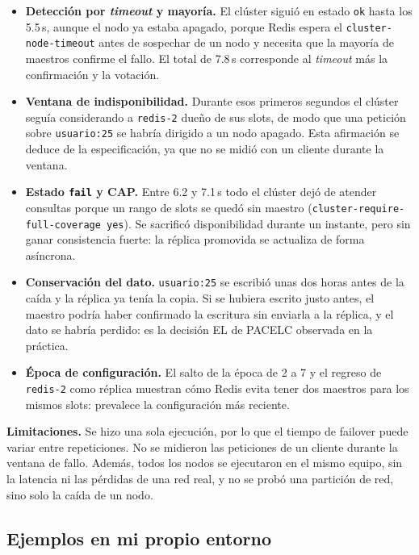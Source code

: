 \documentclass[11pt,a4paper]{article}
\begin{document}
\begin{itemize}
  \item \textbf{Detección por \emph{timeout} y mayoría.} El clúster siguió
  en estado \texttt{ok} hasta los 5.5\,s, aunque el nodo ya estaba apagado,
  porque Redis espera el \texttt{cluster-node-timeout} antes de sospechar de
  un nodo y necesita que la mayoría de maestros confirme el fallo. El total de
  7.8\,s corresponde al \emph{timeout} más la confirmación y la votación.
  \item \textbf{Ventana de indisponibilidad.} Durante esos primeros segundos
  el clúster seguía considerando a \texttt{redis-2} dueño de sus slots, de modo
  que una petición sobre \texttt{usuario:25} se habría dirigido a un nodo
  apagado. Esta afirmación se deduce de la especificación, ya que no se midió
  con un cliente durante la ventana.
  \item \textbf{Estado \texttt{fail} y CAP.} Entre 6.2 y 7.1\,s todo el
  clúster dejó de atender consultas porque un rango de slots se quedó sin
  maestro (\texttt{cluster-require-full-coverage yes}). Se sacrificó
  disponibilidad durante un instante, pero sin ganar consistencia fuerte: la
  réplica promovida se actualiza de forma asíncrona.
  \item \textbf{Conservación del dato.} \texttt{usuario:25} se escribió unas
  dos horas antes de la caída y la réplica ya tenía la copia. Si se hubiera
  escrito justo antes, el maestro podría haber confirmado la escritura sin
  enviarla a la réplica, y el dato se habría perdido: es la decisión EL de
  PACELC observada en la práctica.
  \item \textbf{Época de configuración.} El salto de la época de 2 a 7 y el
  regreso de \texttt{redis-2} como réplica muestran cómo Redis evita tener dos
  maestros para los mismos slots: prevalece la configuración más reciente.
\end{itemize}

\textbf{Limitaciones.} Se hizo una sola ejecución, por lo que el tiempo de
failover puede variar entre repeticiones. No se midieron las peticiones de un
cliente durante la ventana de fallo. Además, todos los nodos se ejecutaron en
el mismo equipo, sin la latencia ni las pérdidas de una red real, y no se
probó una partición de red, sino solo la caída de un nodo.

\subsection{Ejemplos en mi propio entorno}
\end{document}
